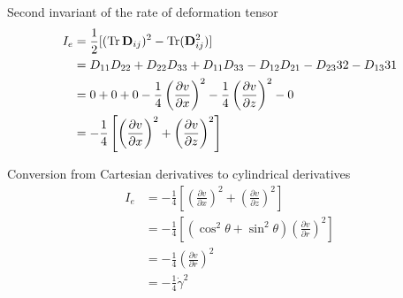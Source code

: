 Second invariant of the rate of deformation tensor
\begin{equation}
\begin{aligned}
  I_e &= \frac{1}{2} [(\operatorname{Tr} \mathbf{D}_{ij})^2 - \operatorname{Tr} (\mathbf{D}_{ij}^2)] \\
  & = D_{11}D_{22} + D_{22}D_{33} + D_{11}D_{33} - D_{12}D_{21} - D_{23}{32} -
  D_{13}{31} \\
  & = 0 + 0 + 0 - \frac{1}{4}\left(\frac{\partial v}{\partial x}\right)^2 -
  \frac{1}{4} \left(\frac{\partial v}{\partial z}\right)^2 - 0 \\
  & = -\frac{1}{4} \left[\left(\frac{\partial v}{\partial x}\right)^2 +
  \left(\frac{\partial v}{\partial z}\right)^2\right] \\
\end{aligned}
\end{equation}

Conversion from Cartesian derivatives to cylindrical derivatives
\cite{SkiSickness}
\begin{equation}
\begin{aligned}
  I_e & = -\frac{1}{4} \left[\left(\frac{\partial v}{\partial x}\right)^2 +
  \left(\frac{\partial v}{\partial z}\right)^2\right] \\
  & = -\frac{1}{4} \left[(\cos^2 \theta + \sin^2 \theta)\left(\frac{\partial v}
  {\partial r} \right)^2\right] \\
  & = -\frac{1}{4} \left(\frac{\partial v}{\partial r}\right)^2 \\
  & = -\frac{1}{4} \dot{\gamma}^2
\end{aligned}
\end{equation}
